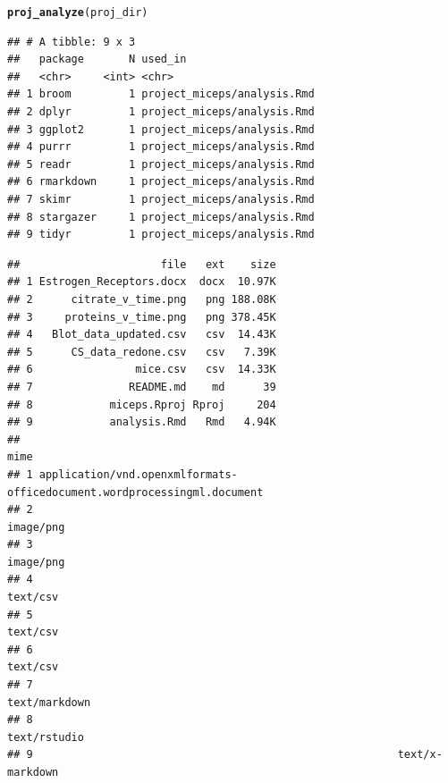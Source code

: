 \documentclass[APA,LATO1COL]{WileyNJD-v2}\usepackage[]{graphicx}\usepackage[]{color}
\makeatletter
\newcommand{\hlstd}[1]{\textcolor[rgb]{0.345,0.345,0.345}{#1}}%
\newcommand{\hlkwd}[1]{\textcolor[rgb]{0.737,0.353,0.396}{\textbf{#1}}}%
\newenvironment{kframe}{%
 \def\at@end@of@kframe{}%
 \ifinner\ifhmode%
  \def\at@end@of@kframe{\end{minipage}}%
  \begin{minipage}{\columnwidth}%
 \fi\fi%
 \def\FrameCommand##1{\hskip\@totalleftmargin \hskip-\fboxsep
 \colorbox{shadecolor}{##1}\hskip-\fboxsep
     \hskip-\linewidth \hskip-\@totalleftmargin \hskip\columnwidth}%
 \MakeFramed {\advance\hsize-\width
   \@totalleftmargin\z@ \linewidth\hsize
   \@setminipage}}%
 {\par\unskip\endMakeFramed%
 \at@end@of@kframe}
\newenvironment{knitrout}{}{} %
\makeatother
\begin{document}
\begin{knitrout}
\color{fgcolor}\begin{kframe}
\begin{alltt}
\hlkwd{proj_analyze}\hlstd{(proj_dir)}
\end{alltt}


{\ttfamily\noindent\itshape\color{messagecolor}{\#\# -- Analysis of reproducibility for project\_miceps ------------------- fertile 0.0.0.9027 --}}

{\ttfamily\noindent\itshape\color{messagecolor}{\#\# --\ \  Packages referenced in source code ----------------------------- fertile 0.0.0.9027 --}}\begin{verbatim}
## # A tibble: 9 x 3
##   package       N used_in                    
##   <chr>     <int> <chr>                      
## 1 broom         1 project_miceps/analysis.Rmd
## 2 dplyr         1 project_miceps/analysis.Rmd
## 3 ggplot2       1 project_miceps/analysis.Rmd
## 4 purrr         1 project_miceps/analysis.Rmd
## 5 readr         1 project_miceps/analysis.Rmd
## 6 rmarkdown     1 project_miceps/analysis.Rmd
## 7 skimr         1 project_miceps/analysis.Rmd
## 8 stargazer     1 project_miceps/analysis.Rmd
## 9 tidyr         1 project_miceps/analysis.Rmd
\end{verbatim}


{\ttfamily\noindent\itshape\color{messagecolor}{\#\# --\ \  Files present in directory ------------------------------------- fertile 0.0.0.9027 --}}\begin{verbatim}
##                      file   ext    size
## 1 Estrogen_Receptors.docx  docx  10.97K
## 2      citrate_v_time.png   png 188.08K
## 3     proteins_v_time.png   png 378.45K
## 4   Blot_data_updated.csv   csv  14.43K
## 5      CS_data_redone.csv   csv   7.39K
## 6                mice.csv   csv  14.33K
## 7               README.md    md      39
## 8            miceps.Rproj Rproj     204
## 9            analysis.Rmd   Rmd   4.94K
##                                                                      mime
## 1 application/vnd.openxmlformats-officedocument.wordprocessingml.document
## 2                                                               image/png
## 3                                                               image/png
## 4                                                                text/csv
## 5                                                                text/csv
## 6                                                                text/csv
## 7                                                           text/markdown
## 8                                                            text/rstudio
## 9                                                         text/x-markdown
\end{verbatim}



\end{kframe}
\end{knitrout}
\end{document}
